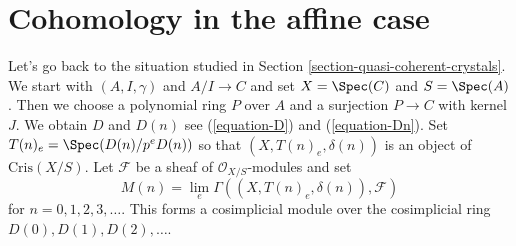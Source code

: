 \section{Cohomology in the affine case}
\label{section-cohomology-affine}

\noindent
Let's go back to the situation studied in
Section \ref{section-quasi-coherent-crystals}. We
start with $(A, I, \gamma)$ and $A/I \to C$ and set
$X = \Spec(C)$ and $S = \Spec(A)$. Then we choose
a polynomial ring $P$ over $A$ and a surjection $P \to C$ with
kernel $J$. We obtain $D$ and $D(n)$ see
(\ref{equation-D}) and (\ref{equation-Dn}).
Set $T(n)_e = \Spec(D(n)/p^eD(n))$ so that
$(X, T(n)_e, \delta(n))$ is an object of $\text{Cris}(X/S)$.
Let $\mathcal{F}$ be a sheaf of $\mathcal{O}_{X/S}$-modules and set
$$
M(n) = \lim_e \Gamma((X, T(n)_e, \delta(n)), \mathcal{F})
$$
for $n = 0, 1, 2, 3, \ldots$. This forms a cosimplicial module
over the cosimplicial ring $D(0), D(1), D(2), \ldots$.

